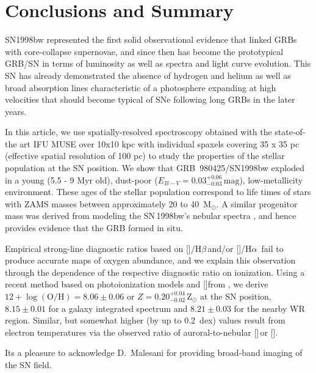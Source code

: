 \documentclass[traditabstract]{aa}
\newcommand{\hb}{H$\beta$}
\newcommand{\ha}{H$\alpha$}
\newcommand{\oh}{$12+\log(\mathrm{O/H})$}
\newcommand{\sii}{[\ion{S}{ii}]}
\newcommand{\siii}{[\ion{S}{iii}]}
\newcommand{\oiii}{[\ion{O}{iii}]}
\newcommand{\nii}{[\ion{N}{ii}]}
\begin{document}
\section{Conclusions and Summary}

SN1998bw represented the first solid observational evidence that linked GRBs with core-collapse supernovae, and since then has become the prototypical GRB/SN in terms of luminosity as well as spectra and light curve evolution. This SN has already demonstrated the absence of hydrogen and helium as well as broad absorption lines characteristic of a photosphere expanding at high velocities that should become typical of SNe following long GRBs in the later years.

In this article, we use spatially-resolved spectroscopy obtained with the state-of-the art IFU MUSE over 10x10 kpc with individual spaxels covering 35 x 35 pc (effective spatial resolution of 100 pc) to study the properties of the stellar population at the SN position. We show that GRB~980425/SN1998bw exploded in a young (5.5 - 9 Myr old), dust-poor ($E_{B-V} = 0.03_{-0.03}^{+0.06}\,\mathrm{mag}$), low-metallicity environment. These ages of the stellar population correspond to life times of stars with ZAMS masses between approximately 20 to 40~M$_{\odot}$. A similar progenitor mass was derived from modeling the SN\,1998bw's nebular spectra \citep{2006ApJ...640..854M}, and hence provides evidence that the GRB formed in situ.

Empirical strong-line diagnostic ratios based on \oiii/\hb\,and/or \nii/\ha\, fail to produce accurate maps of oxygen abundance, and we explain this observation through the dependence of the respective diagnostic ratio on ionization. Using a recent method based on photoionization models and \sii from \citet{2016Ap&SS.361...61D}, we derive \oh$=8.06\pm 0.06$ or $Z=0.20_{-0.02}^{+0.04}$\,Z$_{\odot}$ at the SN position, $8.15 \pm 0.01$ for a galaxy integrated spectrum and $8.21\pm 0.03$ for the nearby WR region. Similar, but somewhat higher (by up to 0.2~dex) values result from electron temperatures via the observed ratio of auroral-to-nebular \siii\,or \oiii.

\begin{acknowledgements}

Its a pleasure to acknowledge D.~Malesani for providing broad-band imaging of the SN field.

\end{acknowledgements}






\end{document}
